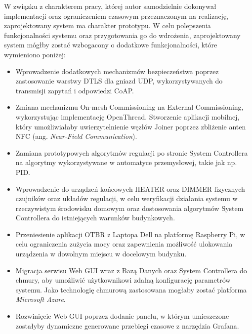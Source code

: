 W związku z charakterem pracy, której autor samodzielnie dokonywał implementacji oraz ograniczeniem czasowym przeznaczonym na realizację, zaprojektowany system ma charakter prototypu. W celu polepszenia funkcjonalności systemu oraz przygotowania go do wdrożenia,
zaprojektowany system mógłby zostać wzbogacony o dodatkowe funkcjonalności, które wymieniono poniżej:
\begin{itemize}
    \item Wprowadzenie dodatkowych mechanizmów bezpieczeństwa poprzez zastosowanie warstwy DTLS dla gniazd UDP, wykorzystywanych do transmisji zapytań i odpowiedzi CoAP. 
    \item Zmiana mechanizmu On-mesh Commissioning na External Commissioning, wykorzystując implementację  OpenThread. Stworzenie aplikacji mobilnej, który umożliwiałaby uwierzytelnienie węzłów Joiner poprzez zbliżenie anten NFC (ang. \textit{Near-Field Communication}).
    \item Zamiana prototypowych algorytmów regulacji po stronie System Controllera na algorytmy wykorzystywane w automatyce przemysłowej, takie jak np. PID.
    \item Wprowadzenie do urządzeń końcowych HEATER oraz DIMMER fizycznych czujników oraz układów regulacji, w celu weryfikacji działania systemu w rzeczywistym środowisku domowym oraz dostosowania algorytmów System Controllera do istniejących warunków budynkowych.
    \item Przeniesienie aplikacji OTBR z Laptopa Dell na platformę Raspberry Pi, w celu ograniczenia zużycia mocy oraz zapewnienia możliwość ulokowania urządzenia w dowolnym miejscu w docelowym budynku.
    \item Migracja serwisu Web GUI wraz z Bazą Danych oraz System Controllera do chmury, aby umożliwić użytkownikowi zdalną konfigurację parametrów systemu. Jako technologię chmurową zastosowana mogłaby zostać platforma \textit{Microsoft Azure}.
    \item Rozwinięcie Web GUI poprzez dodanie panelu, w którym umieszczone zostałyby dynamiczne generowane przebiegi czasowe z narzędzia Grafana.
\end{itemize}

